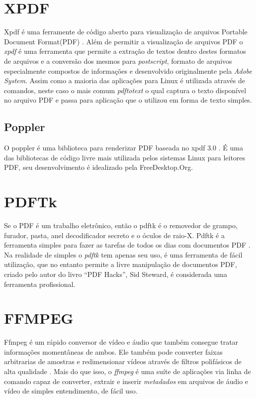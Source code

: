\section{XPDF}
Xpdf é uma ferramente de código aberto para visualização de  arquivos Portable Document Format(PDF) \cite{Glyph & Cog 2011}.
Além de permitir a visualização de arquivos PDF o \textit{xpdf} é uma ferramenta que permite a extração de textos dentro destes formatos de arquivos e a conversão dos mesmos para \textit{postscript}, formato de arquivos especialmente compostos de informações e desenvolvido originalmente pela \textit{Adobe System}.
Assim como a maioria das aplicações para Linux é utilizada através de comandos, neste caso o mais comum \textit{pdftotext} o qual captura o texto disponível no arquivo PDF e passa para aplicação que o utilizou em forma de texto simples.

\subsection{Poppler}
O poppler é uma biblioteca para renderizar PDF baseada no xpdf 3.0 \cite{jOHNSON 2012}.
É uma das bibliotecas de código livre mais utilizada pelos sistemas Linux para leitores PDF, seu desenvolvimento é idealizado pela FreeDesktop.Org.

\section{PDFTk}
Se o PDF é um trabalho eletrônico, então o pdftk é o removedor de grampo, furador, pasta, anel decodificador secreto e o óculos de raio-X. Pdftk é a ferramenta simples para fazer as tarefas de todos os dias com documentos PDF \cite{STEWARD 2011}.
Na realidade de simples o \textit{pdftk} tem apenas seu uso, é uma ferramenta de fácil utilização, que no entanto permite a livre manipulação de documentos PDF, criado pelo autor do livro “PDF Hacks”, Sid Steward, é considerada uma ferramenta profissional.

\section{FFMPEG}
Ffmpeg é um rápido conversor de vídeo e áudio que também consegue tratar informações momentâneas de ambos. Ele também pode converter faixas arbitrarias de amostras e redimensionar vídeos através de filtros polifásicos de alta qualidade \cite{Ffmpeg.Org 2011}.
Mais do que isso, o \textit{ffmpeg} é uma suíte de aplicações via linha de comando capaz de converter, extrair e inserir \textit{metadados} em arquivos de áudio e vídeo de simples entendimento, de fácil uso.

